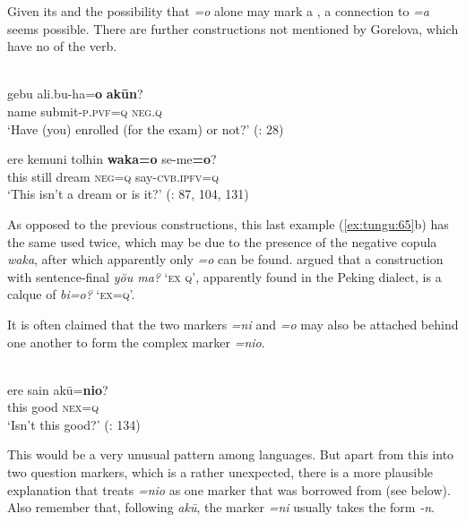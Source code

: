 Given its  and the possibility that \textit{=o} alone may mark a , a connection to  \textit{=a} seems possible. There are further constructions not mentioned by Gorelova, which have no  of the verb.

\ea%
    \label{ex:tungu:65}
    \\
    \ea
    \gll gebu  ali.bu-ha=\textbf{{o}} \textbf{{ak\=un}}?\\
    name  submit-\textsc{p.pvf}=\textsc{q}  \textsc{neg.q}\\
    \glt ‘Have (you) enrolled (for the exam) or not?’ (\citealt{vonMöllendorff1892}: 28)
    
    \ex
    \gll ere kemuni tolhin \textbf{{waka}}\textbf{{=}}\textbf{{o}} se{-}{me}\textbf{{=}}\textbf{{o}}?\\
    this  still    dream  \textsc{neg}=\textsc{q}    say-\textsc{cvb.ipfv}=\textsc{q}\\
    \glt ‘This isn’t a dream or is it?’ (\citealt{DiCosmo2006}: 87, 104, 131)
    \z
    \z

As opposed to the previous constructions, this last example (\ref{ex:tungu:65}b) has the same  used twice, which may be due to the presence of the negative copula \textit{waka}, after which apparently only \textit{=o} can be found. \citet[72]{AixinjueluoYingsheng1987b} argued that a   construction with sentence-final \textit{yŏu ma?}  ‘\textsc{ex} \textsc{q}’, apparently found in the Peking dialect, is a calque of  \textit{bi=o?} ‘\textsc{ex}=\textsc{q}’.

It is often claimed that the two markers \textit{=ni} and \textit{=o} may also be attached behind one another to form the complex marker \textit{=nio}.

\ea%
    \label{ex:tungu:66}
    \\
    \gll ere sain ak\=u=\textbf{{nio}}?\\
    this  good  \textsc{nex}=\textsc{q}\\
    \glt ‘Isn’t this good?’ (\citealt{Wuge1730,Wylie1855}: 134)
    \z

This would be a very unusual pattern among  languages. But apart from this  into two question markers, which is a rather unexpected, there is a more plausible explanation that treats \textit{=nio} as one marker that was borrowed from  (see below). Also remember that, following \textit{ak\=u}, the marker \textit{=ni} usually takes the form \textit{-n}.


